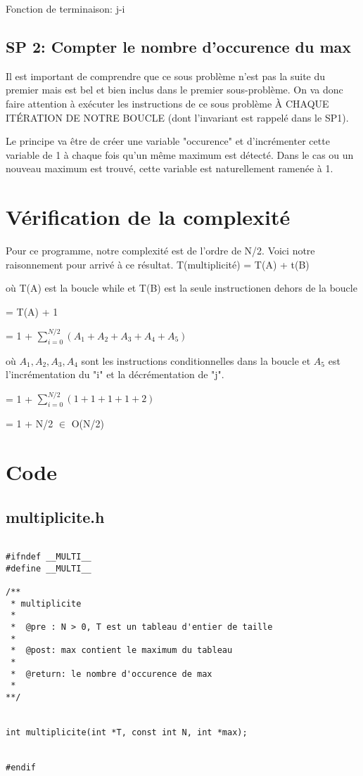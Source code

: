 \documentclass[a4paper, 11pt, oneside]{article}
\begin{document}
Fonction de terminaison: j-i

\subsection{SP 2: Compter le nombre d'occurence du max}

Il est important de comprendre que ce sous problème n'est pas la suite du premier mais est bel et bien inclus dans le premier sous-problème. On va donc faire attention à exécuter les instructions de ce sous problème À CHAQUE ITÉRATION DE NOTRE BOUCLE (dont l'invariant est rappelé dans  le SP1).

Le principe va être de créer une variable "occurence" et d'incrémenter cette variable de 1 à chaque fois qu'un même maximum est détecté. Dans le cas ou un nouveau maximum est trouvé, cette variable est naturellement ramenée à 1.



\section{Vérification de la complexité}

Pour ce programme, notre complexité est de l'ordre de N/2. Voici notre raisonnement pour arrivé à ce résultat.
\bigskip
T(multiplicité) = T(A) + t(B)

où T(A) est la boucle while et T(B) est la seule instructionen dehors de la boucle

= T(A) + 1

= 1 + $\sum_{i = 0}^{N/2} (A_1 + A_2 + A_3 + A_4 + A_5)$

où $A_1, A_2, A_3, A_4$ sont les instructions conditionnelles dans la boucle et $A_5$ est l'incrémentation du "i" et la décrémentation de "j".

= 1 + $\sum_{i = 0}^{N/2} (1 + 1 + 1 + 1 + 2)$

= 1 + N/2 $\in$ O(N/2)


\section{Code}
\subsection{multiplicite.h}
\begin{lstlisting}[caption={Header}]

#ifndef __MULTI__
#define __MULTI__

/**
 * multiplicite
 *
 *  @pre : N > 0, T est un tableau d'entier de taille
 *
 *  @post: max contient le maximum du tableau
 *
 *  @return: le nombre d'occurence de max
 *
**/


int multiplicite(int *T, const int N, int *max);


#endif


\end{lstlisting}
\end{document}
